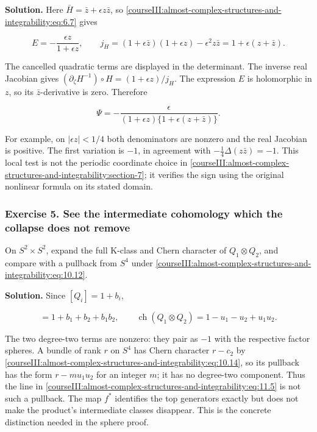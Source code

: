 \textbf{Solution.} Here \(\bar H=\bar z+\epsilon z\bar z\), so \eqref{courseIII:almost-complex-structures-and-integrability:eq:6.7} gives

\begin{equation}
E=-\frac{\epsilon z}{1+\epsilon z},
\qquad
j_H=(1+\epsilon\bar z)(1+\epsilon z)-\epsilon^2z\bar z
=1+\epsilon(z+\bar z).
\label{courseIII:almost-complex-structures-and-integrability:eq:11.3}
\end{equation}

The cancelled quadratic terms are displayed in the determinant. The inverse real Jacobian gives
\((\partial_\zeta H^{-1})\circ H=(1+\epsilon z)/j_H\).
The expression \(E\) is holomorphic in \(z\), so its \(\bar z\)-derivative is zero. Therefore

\begin{equation}
\Psi=-\frac{\epsilon}
{(1+\epsilon z)\{1+\epsilon(z+\bar z)\}}.
\label{courseIII:almost-complex-structures-and-integrability:eq:11.4}
\end{equation}

For example, on \(|\epsilon z|<1/4\) both denominators are nonzero and the real Jacobian is positive. The first variation is \(-1\), in agreement with \(-\frac14\Delta(z\bar z)=-1\). This local test is not the periodic coordinate choice in \cref{courseIII:almost-complex-structures-and-integrability:section-7}; it verifies the sign using the original nonlinear formula on its stated domain.

\subsubsection{Exercise 5. See the intermediate cohomology which the collapse does not remove}
\label{courseIII:almost-complex-structures-and-integrability:exercise-5}

On \(S^2\times S^2\), expand the full K-class and Chern character of \(Q_1\otimes Q_2\), and compare with a pullback from \(S^4\) under \eqref{courseIII:almost-complex-structures-and-integrability:eq:10.12}.

\textbf{Solution.} Since \([Q_i]=1+b_i\),

\begin{equation}
[Q_1\otimes Q_2]=1+b_1+b_2+b_1b_2,
\qquad
\operatorname{ch}(Q_1\otimes Q_2)
=1-u_1-u_2+u_1u_2.
\label{courseIII:almost-complex-structures-and-integrability:eq:11.5}
\end{equation}

The two degree-two terms are nonzero: they pair as \(-1\) with the respective factor spheres. A bundle of rank \(r\) on \(S^4\) has Chern character \(r-c_2\) by \eqref{courseIII:almost-complex-structures-and-integrability:eq:10.14}, so its pullback has the form \(r-mu_1u_2\) for an integer \(m\); it has no degree-two component. Thus the line in \eqref{courseIII:almost-complex-structures-and-integrability:eq:11.5} is not such a pullback. The map \(f^*\) identifies the top generators exactly but does not make the product's intermediate classes disappear. This is the concrete distinction needed in the sphere proof.


